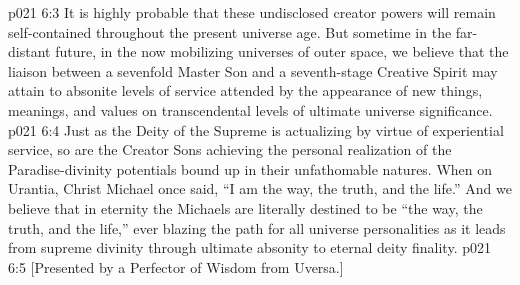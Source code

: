 \vs p021 6:3 It is highly probable that these undisclosed creator powers will remain self\hyp{}contained throughout the present universe age. But sometime in the far\hyp{}distant future, in the now mobilizing universes of outer space, we believe that the liaison between a sevenfold Master Son and a seventh\hyp{}stage Creative Spirit may attain to absonite levels of service attended by the appearance of new things, meanings, and values on transcendental levels of ultimate universe significance.
\vs p021 6:4 Just as the Deity of the Supreme is actualizing by virtue of experiential service, so are the Creator Sons achieving the personal realization of the Paradise\hyp{}divinity potentials bound up in their unfathomable natures. When on Urantia, Christ Michael once said, \textcolor{ubdarkred}{“I am the way, the truth, and the life.”} And we believe that in eternity the Michaels are literally destined to be “the way, the truth, and the life,” ever blazing the path for all universe personalities as it leads from supreme divinity through ultimate absonity to eternal deity finality.
\vsetoff
\vs p021 6:5 [Presented by a Perfector of Wisdom from Uversa.]
